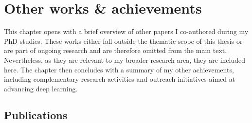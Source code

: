 \chapter{Other works \& achievements}\label{chapter:other}

This chapter opens with a brief overview of other papers I co-authored during my PhD studies. These works either fall outside the thematic scope of this thesis or are part of ongoing research and are therefore omitted from the main text. Nevertheless, as they are relevant to my broader research area, they are included here. The chapter then concludes with a summary of my other achievements, including complementary research activities and outreach initiatives aimed at advancing deep learning.

\section{Publications}

